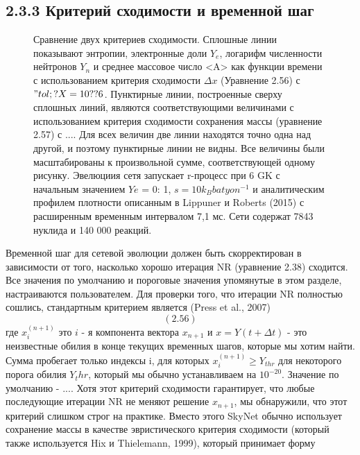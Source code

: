 \documentclass[%
bachelor,    %
natbib,      %
subf,        %
href,        %
colorlinks,  %
]{disser}
\begin{document}
\subsection{2.3.3 Критерий сходимости и временной шаг}
\begin{figure}[h]
	\caption{Сравнение двух критериев сходимости. Сплошные линии показывают энтропии, электронные доли $Y_e$, логарифм численности нейтронов $Y_n$ и среднее массовое число <A> как функции времени с использованием критерия сходимости $\Delta x$ (Уравнение 2.56) с $"tol;? X = 10??6$. Пунктирные линии, построенные сверху сплошных линий, являются соответствующими величинами с использованием критерия сходимости сохранения массы (уравнение 2.57) с $...$. Для всех величин две линии находятся точно одна над другой, и поэтому пунктирные линии не видны. Все величины были масштабированы к произвольной сумме, соответствующей одному рисунку. Эвелюциия сетя запускает r-процесс при 6 GK с начальным значением $Ye$ = 0: 1, $s = 10 k_B batyon^{-1}$ и аналитическим профилем плотности описанным в Lippuner и Roberts (2015) с расширенным временным интервалом 7,1 мс. Сети содержат 7843 нуклида и 140 000 реакций.}
	\label{ris:21}
\end{figure}
Временной шаг для сетевой эволюции должен быть скорректирован в зависимости от того, насколько хорошо итерация NR (уравнение 2.38) сходится. Все значения по умолчанию и пороговые значения упомянутые в этом разделе, настраиваются пользователем. Для проверки того, что итерации NR полностью сошлись, стандартным критерием является (Press et al., 2007)
$$(2.56)$$
где $x_i^{(n+1)}$ это $i$ - я компонента вектора $x_{n + 1}$ и $x = Y(t + \Delta t)$  - это неизвестные обилия в конце текущих временных шагов, которые мы хотим найти. Сумма пробегает только индексы i, для которых $x_i^{(n+1)} \ge Y_{thr}$ для некоторого порога обилия $Y_thr$, который мы обычно устанавливаем на $10^{-20}$. Значение по умолчанию - $...$. Хотя этот критерий сходимости гарантирует, что любые последующие итерации NR не меняют решение $x_{n + 1}$, мы обнаружили, что этот критерий слишком строг на практике. Вместо этого SkyNet обычно использует сохранение массы в качестве эвристического критерия сходимости (который также используется Hix и Thielemann, 1999), который принимает форму
\end{document}
